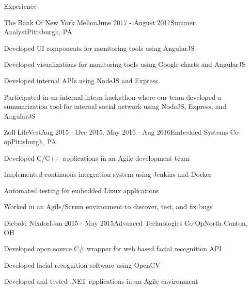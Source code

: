 \documentclass{resume} %
\begin{document}
\begin{rSection}{Experience}

\begin{rSubsection}{The Bank Of New York Mellon}{June 2017 - August 2017}{Summer Analyst}{Pittsburgh, PA}
\item Developed UI components for monitoring tools using AngularJS
\item Developed visualizations for monitoring tools using Google charts and AngularJS
\item Developed internal APIs using NodeJS and Express 
\item Participated in an internal intern hackathon where our team developed a summarization tool for internal social network using NodeJS, Express, and AngularJS
\end{rSubsection}


\begin{rSubsection}{Zoll LifeVest}{Aug 2015 - Dec 2015, May 2016 - Aug 2016}{Embedded Systems Co-op}{Pittsburgh, PA}
\item Developed C/C++ applications in an Agile development team
\item Implemented continuous integration system using Jenkins and Docker
\item Automated testing for embedded Linux applications
\item Worked in an Agile/Scrum environment to discover, test, and fix bugs
\end{rSubsection}


\begin{rSubsection}{Diebold Nixdorf}{Jan 2015 - May 2015}{Advanced Technologies Co-Op}{North Canton, OH}
\item Developed open source C\# wrapper for web based facial recognition API
\item Developed facial recognition software using OpenCV
\item Developed and tested .NET applications in an Agile environment
\end{rSubsection}

\end{rSection}

\end{document}
